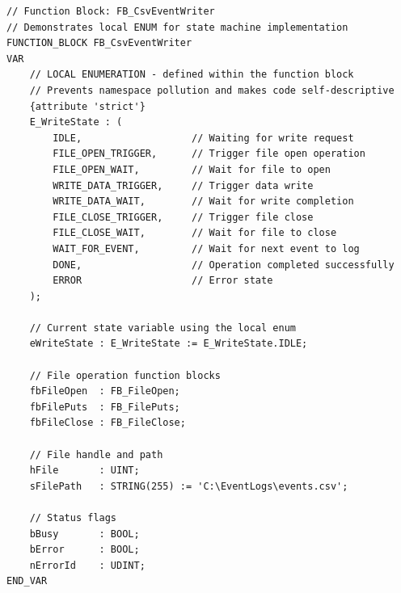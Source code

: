 \documentclass[11pt,a4paper]{article}
\begin{document}
\begin{lstlisting}
// Function Block: FB_CsvEventWriter
// Demonstrates local ENUM for state machine implementation
FUNCTION_BLOCK FB_CsvEventWriter
VAR
    // LOCAL ENUMERATION - defined within the function block
    // Prevents namespace pollution and makes code self-descriptive
    {attribute 'strict'}
    E_WriteState : (
        IDLE,                   // Waiting for write request
        FILE_OPEN_TRIGGER,      // Trigger file open operation
        FILE_OPEN_WAIT,         // Wait for file to open
        WRITE_DATA_TRIGGER,     // Trigger data write
        WRITE_DATA_WAIT,        // Wait for write completion
        FILE_CLOSE_TRIGGER,     // Trigger file close
        FILE_CLOSE_WAIT,        // Wait for file to close
        WAIT_FOR_EVENT,         // Wait for next event to log
        DONE,                   // Operation completed successfully
        ERROR                   // Error state
    );
    
    // Current state variable using the local enum
    eWriteState : E_WriteState := E_WriteState.IDLE;
    
    // File operation function blocks
    fbFileOpen  : FB_FileOpen;
    fbFilePuts  : FB_FilePuts;
    fbFileClose : FB_FileClose;
    
    // File handle and path
    hFile       : UINT;
    sFilePath   : STRING(255) := 'C:\EventLogs\events.csv';
    
    // Status flags
    bBusy       : BOOL;
    bError      : BOOL;
    nErrorId    : UDINT;
END_VAR
\end{lstlisting}
\end{document}
